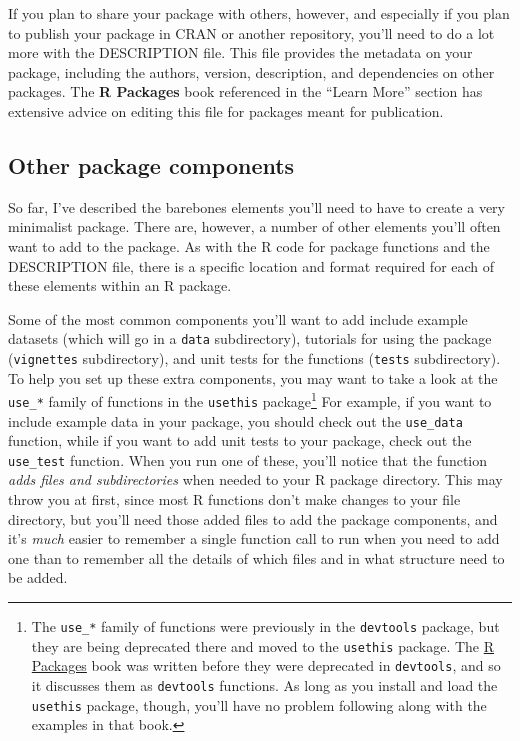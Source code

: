 \documentclass[]{tufte-book}
\begin{document}
If you plan to share your package with others, however, and especially if you
plan to publish your package in CRAN or another repository, you'll need to do
a lot more with the DESCRIPTION file. This file provides the metadata on your package,
including the authors, version, description, and dependencies on other packages.
The \textbf{R Packages} book referenced in the ``Learn More'' section has extensive advice
on editing this file for packages meant for publication.

\hypertarget{other-package-components}{%
\subsection{Other package components}\label{other-package-components}}

So far, I've described the barebones elements you'll need to have to create a very
minimalist package. There are, however, a number of other elements you'll often
want to add to the package. As with the R code for package functions and the
DESCRIPTION file, there is a specific location and format required for each of
these elements within an R package.

Some of the most common components you'll want to add include example datasets
(which will go in a \texttt{data} subdirectory), tutorials for using the package
(\texttt{vignettes} subdirectory), and unit tests for the functions (\texttt{tests}
subdirectory). To help you set up these extra components, you may want to take a
look at the \texttt{use\_*} family of functions in the \texttt{usethis} \citep{R-usethis}
package\footnote{The \texttt{use\_*} family of functions were previously in the \texttt{devtools}
  package, but they are being deprecated there and moved to the \texttt{usethis} package.
  The \href{http://r-pkgs.had.co.nz/}{R Packages} book was written before they were
  deprecated in \texttt{devtools}, and so it discusses them as \texttt{devtools} functions. As
  long as you install and load the \texttt{usethis} package, though, you'll have no
  problem following along with the examples in that book.} For example, if you
want to include example data in your package, you should check out the
\texttt{use\_data} function, while if you want to add unit tests to your package, check
out the \texttt{use\_test} function. When you run one of these, you'll notice that the
function \emph{adds files and subdirectories} when needed to your R package
directory. This may throw you at first, since most R functions don't make
changes to your file directory, but you'll need those added files to add the
package components, and it's \emph{much} easier to remember a single function call to
run when you need to add one than to remember all the details of which files and
in what structure need to be added.
\end{document}
